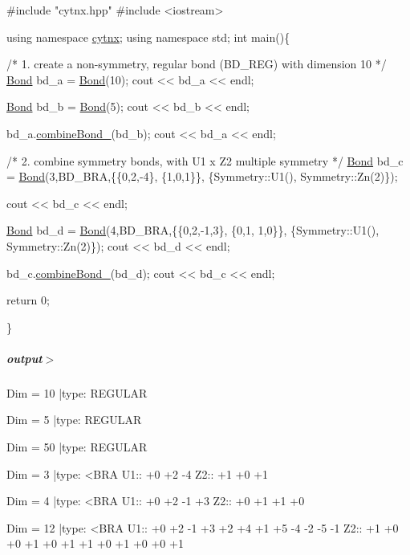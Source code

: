 \begin{DoxyCodeInclude}
\textcolor{preprocessor}{#include "cytnx.hpp"}
\textcolor{preprocessor}{#include <iostream>}


\textcolor{keyword}{using namespace }\hyperlink{namespacecytnx}{cytnx};
\textcolor{keyword}{using namespace }std;
\textcolor{keywordtype}{int} main()\{ 

    \textcolor{comment}{/* 1.}
\textcolor{comment}{        create a non-symmetry, regular bond (BD\_REG) }
\textcolor{comment}{        with dimension 10}
\textcolor{comment}{    */}
    \hyperlink{classcytnx_1_1Bond}{Bond} bd\_a = \hyperlink{classcytnx_1_1Bond}{Bond}(10);
    cout << bd\_a << endl;

    \hyperlink{classcytnx_1_1Bond}{Bond} bd\_b = \hyperlink{classcytnx_1_1Bond}{Bond}(5);
    cout << bd\_b << endl;


    bd\_a.\hyperlink{classcytnx_1_1Bond_ac21ab26ec469ac56ae78c9e4bbbe7040}{combineBond\_}(bd\_b);
    cout << bd\_a << endl;


    \textcolor{comment}{/* 2.}
\textcolor{comment}{        combine symmetry bonds, }
\textcolor{comment}{        with U1 x Z2 multiple symmetry }
\textcolor{comment}{    */}
    \hyperlink{classcytnx_1_1Bond}{Bond} bd\_c = \hyperlink{classcytnx_1_1Bond}{Bond}(3,BD\_BRA,\{\{0,2,-4\},
                               \{1,0,1\}\},
                              \{Symmetry::U1(),
                               Symmetry::Zn(2)\});
                                
    cout << bd\_c << endl;

    \hyperlink{classcytnx_1_1Bond}{Bond} bd\_d = \hyperlink{classcytnx_1_1Bond}{Bond}(4,BD\_BRA,\{\{0,2,-1,3\},
                               \{0,1, 1,0\}\},
                              \{Symmetry::U1(),
                               Symmetry::Zn(2)\});
    cout << bd\_d << endl;

    
    bd\_c.\hyperlink{classcytnx_1_1Bond_ac21ab26ec469ac56ae78c9e4bbbe7040}{combineBond\_}(bd\_d);
    cout << bd\_c << endl;

    \textcolor{keywordflow}{return} 0;
    


\}

\end{DoxyCodeInclude}
 \subparagraph*{output$>$}


\begin{DoxyVerbInclude}
Dim = 10 |type: REGULAR 

Dim = 5 |type: REGULAR 

Dim = 50 |type: REGULAR 

Dim = 3 |type: <BRA     
 U1::  +0 +2 -4
 Z2::  +1 +0 +1

Dim = 4 |type: <BRA     
 U1::  +0 +2 -1 +3
 Z2::  +0 +1 +1 +0

Dim = 12 |type: <BRA     
 U1::  +0 +2 -1 +3 +2 +4 +1 +5 -4 -2 -5 -1
 Z2::  +1 +0 +0 +1 +0 +1 +1 +0 +1 +0 +0 +1

\end{DoxyVerbInclude}
